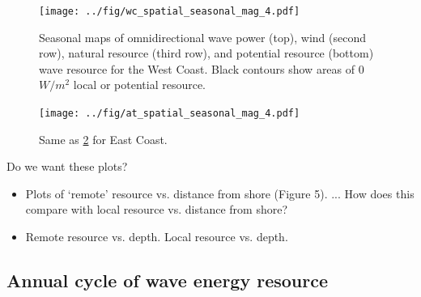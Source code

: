 
\begin{figure}[ht]
  \centering
  \texttt{[image: ../fig/wc\_spatial\_seasonal\_mag\_4.pdf]}
  \caption{Seasonal maps of omnidirectional wave power (top), wind (second row), natural resource (third row), and potential resource (bottom) wave resource for the West Coast. Black contours show areas of 0 $W/m^{2}$ local or potential resource.}
  \label{fig:maps-wc}
\end{figure}

\begin{figure}[ht]
  \centering
  \texttt{[image: ../fig/at\_spatial\_seasonal\_mag\_4.pdf]}
  \caption{Same as \ref{fig:maps-at} for East Coast.}
  \label{fig:maps-at}
\end{figure}


Do we want these plots?
\begin{itemize}
\item Plots of ‘remote’ resource vs. distance from shore (Figure 5). ... How does this compare with local resource vs. distance from shore?
\item Remote resource vs. depth. Local resource vs. depth.
\end{itemize}

\subsection{Annual cycle of wave energy resource}

